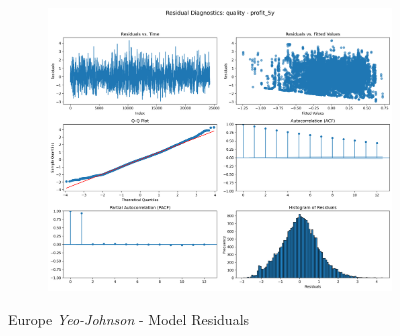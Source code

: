 \documentclass[11pt,english,a4paper,hidelinks]{book}
\begin{document}
\begin{figure}[H]
\begin{subfigure}[b]{0.32\textwidth}
    \end{subfigure}
    \hfill
    \begin{subfigure}[b]{0.32\textwidth}
        \centering
        \includegraphics[width=\textwidth]{images/code/models/linear_regression/first_model/EU/quality_profit_5y_residuals - Gaussian.png}
    \end{subfigure}
    \caption{Europe \textit{Yeo-Johnson} - Model Residuals}
    \label{fig:linear_regression_EU_residues_gaussian}
\end{figure}
\end{document}
